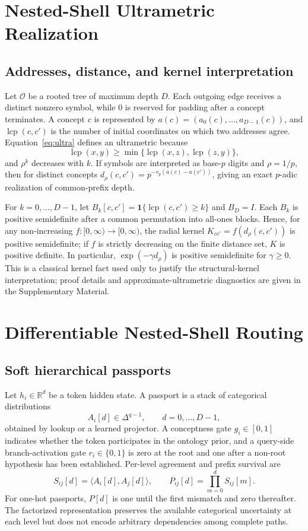 \documentclass[preprint,11pt]{elsarticle}
\begin{document}
\section{Nested-Shell Ultrametric Realization}
\subsection{Addresses, distance, and kernel interpretation}
Let $\mathcal O$ be a rooted tree of maximum depth $D$. Each outgoing edge receives a distinct nonzero symbol, while 0 is reserved for padding after a concept terminates. A concept $c$ is represented by $a(c)=(a_0(c),\ldots,a_{D-1}(c))$, and $\operatorname{lcp}(c,c')$ is the number of initial coordinates on which two addresses agree. Equation~\eqref{eq:ultra} defines an ultrametric because
\[
\operatorname{lcp}(x,y)\geq \min\{\operatorname{lcp}(x,z),\operatorname{lcp}(z,y)\},
\]
and $\rho^k$ decreases with $k$. If symbols are interpreted as base-$p$ digits and $\rho=1/p$, then for distinct concepts $d_\rho(c,c')=p^{-v_p(a(c)-a(c'))}$, giving an exact $p$-adic realization of common-prefix depth.

For $k=0,\ldots,D-1$, let $B_k[c,c']=\mathbf 1\{\operatorname{lcp}(c,c')\geq k\}$ and $B_D=I$. Each $B_k$ is positive semidefinite after a common permutation into all-ones blocks. Hence, for any non-increasing $f:[0,\infty)\to[0,\infty)$, the radial kernel $K_{cc'}=f(d_\rho(c,c'))$ is positive semidefinite; if $f$ is strictly decreasing on the finite distance set, $K$ is positive definite. In particular, $\exp(-\gamma d_\rho)$ is positive semidefinite for $\gamma\geq0$. This is a classical kernel fact used only to justify the structural-kernel interpretation; proof details and approximate-ultrametric diagnostics are given in the Supplementary Material.

\section{Differentiable Nested-Shell Routing}
\subsection{Soft hierarchical passports}
Let $h_i\in\mathbb R^d$ be a token hidden state. A passport is a stack of categorical distributions
\begin{equation}
 A_i[d]\in\Delta^{q-1},\qquad d=0,\ldots,D-1,
\end{equation}
obtained by lookup or a learned projector. A conceptness gate $g_i\in[0,1]$ indicates whether the token participates in the ontology prior, and a query-side branch-activation gate $r_i\in\{0,1\}$ is zero at the root and one after a non-root hypothesis has been established. Per-level agreement and prefix survival are
\begin{equation}
 S_{ij}[d]=\langle A_i[d],A_j[d]\rangle,\qquad P_{ij}[d]=\prod_{m=0}^{d}S_{ij}[m].
 \label{eq:survival}
\end{equation}
For one-hot passports, $P[d]$ is one until the first mismatch and zero thereafter. The factorized representation preserves the available categorical uncertainty at each level but does not encode arbitrary dependencies among complete paths.
\end{document}
